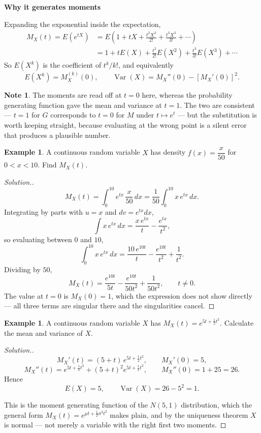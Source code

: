 \documentclass[11pt,a4paper]{article}
\theoremstyle{definition}
\newtheorem{exa}[thm]{Example}
\newtheorem*{note}{Note}
\newenvironment{solution}
  {\renewcommand{\qedsymbol}{}\begin{proof}[\textit{Solution}.]}
  {\end{proof}}
\newcommand{\subhead}[1]{%
  \par\medskip\noindent\textbf{#1}\par\nobreak\smallskip}
\DeclareMathOperator{\Var}{Var}
\begin{document}
\subhead{Why it generates moments}
Expanding the exponential inside the expectation,
\begin{align*}
M_X(t) = E\left(e^{tX}\right) &= E\left(1 + tX + \frac{t^{2}X^{2}}{2!} + \frac{t^{3}X^{3}}{3!} + \cdots\right) \\
&= 1 + tE(X) + \frac{t^{2}}{2!}E\left(X^{2}\right) + \frac{t^{3}}{3!}E\left(X^{3}\right) + \cdots
\end{align*}
So $E\left(X^{k}\right)$ is the coefficient of $t^{k}/k!$, and equivalently
$$E\left(X^{k}\right) = M_X^{(k)}(0),\qquad
\Var(X) = M_X''(0) - \left[M_X'(0)\right]^{2}.$$

\begin{note}
The moments are read off at $t=0$ here, whereas the probability generating
function gave the mean and variance at $t=1$. The two are consistent --- $t=1$
for $G$ corresponds to $t=0$ for $M$ under $t\mapsto e^{t}$ --- but the
substitution is worth keeping straight, because evaluating at the wrong point is
a silent error that produces a plausible number.
\end{note}

\begin{exa}
A continuous random variable $X$ has density $f(x) = \dfrac{x}{50}$ for
$0<x<10$. Find $M_X(t)$.
\end{exa}

\begin{solution}
$$M_X(t) = \int_0^{10} e^{tx}\,\frac{x}{50}\,dx = \frac{1}{50}\int_0^{10} x\,e^{tx}\,dx .$$
Integrating by parts with $u=x$ and $dv=e^{tx}dx$,
$$\int x\,e^{tx}\,dx = \frac{x\,e^{tx}}{t} - \frac{e^{tx}}{t^{2}},$$
so evaluating between $0$ and $10$,
$$\int_0^{10} x\,e^{tx}\,dx = \frac{10\,e^{10t}}{t} - \frac{e^{10t}}{t^{2}} + \frac{1}{t^{2}} .$$
Dividing by $50$,
$$M_X(t) = \frac{e^{10t}}{5t} - \frac{e^{10t}}{50t^{2}} + \frac{1}{50t^{2}},
\qquad t\neq 0 .$$
The value at $t=0$ is $M_X(0)=1$, which the expression does not show directly
--- all three terms are singular there and the singularities cancel.
\end{solution}

\begin{exa}
A continuous random variable $X$ has $M_X(t) = e^{5t + \frac12 t^{2}}$.
Calculate the mean and variance of $X$.
\end{exa}

\begin{solution}
$$M_X'(t) = (5+t)\,e^{5t+\frac12t^{2}},\qquad M_X'(0) = 5 ,$$
$$M_X''(t) = e^{5t+\frac12t^{2}} + (5+t)^{2}e^{5t+\frac12t^{2}},\qquad
M_X''(0) = 1 + 25 = 26 .$$
Hence
$$E(X) = 5,\qquad \Var(X) = 26 - 5^{2} = 1 .$$

This is the moment generating function of the $N\left(5,1\right)$ distribution,
which the general form $M_X(t)=e^{\mu t + \frac12\sigma^{2}t^{2}}$ makes plain,
and by the uniqueness theorem $X$ is normal --- not merely a variable with the
right first two moments.
\end{solution}
\end{document}
